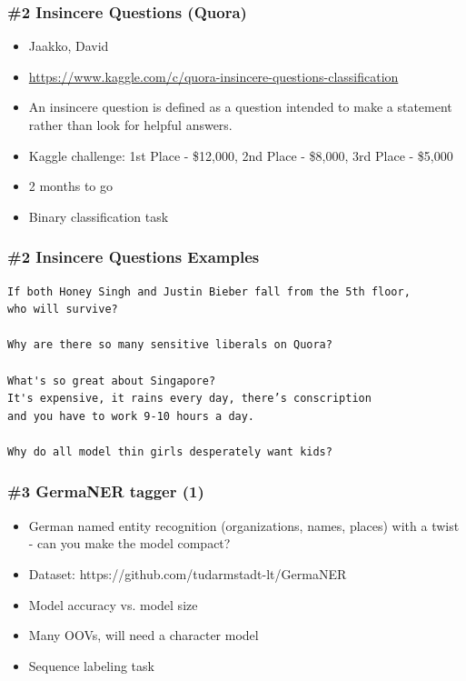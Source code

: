 \documentclass{beamer}
\begin{document}
\begin{frame}
\frametitle{\#2 Insincere Questions (Quora)}
\begin{itemize}
    \item Jaakko, David
    \item \url{https://www.kaggle.com/c/quora-insincere-questions-classification}
	\item An insincere question is defined as a question intended to make a statement rather than look for helpful answers. 
	\item Kaggle challenge: 1st Place - \$12,000, 2nd Place - \$8,000, 3rd Place - \$5,000
	\item 2 months to go
	\item Binary classification task
 \end{itemize}
\end{frame}

\begin{frame}[fragile]
\frametitle{\#2 Insincere Questions Examples}
  \begin{Verbatim}[fontsize=\footnotesize]
If both Honey Singh and Justin Bieber fall from the 5th floor, 
who will survive?

Why are there so many sensitive liberals on Quora?

What's so great about Singapore?
It's expensive, it rains every day, there’s conscription 
and you have to work 9-10 hours a day.
 
Why do all model thin girls desperately want kids?
  \end{Verbatim}
\end{frame}

\begin{frame}
\frametitle{\#3 GermaNER tagger (1)}
\begin{itemize}
	\item German named entity recognition (organizations, names, places) with a twist - can you make the model compact?
	\item Dataset: https://github.com/tudarmstadt-lt/GermaNER
	\item Model accuracy vs. model size
	\item Many OOVs, will need a character model
    \item Sequence labeling task
 \end{itemize}
\end{frame}
\end{document}
